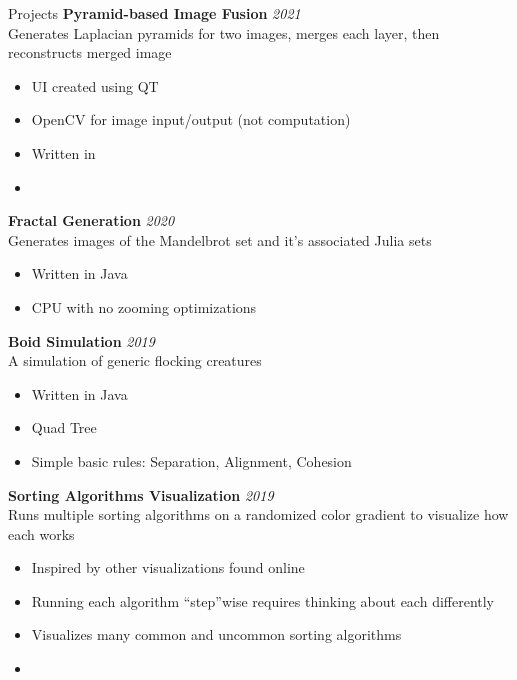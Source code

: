 \begin{rSection}{Projects}
		{\bf Pyramid-based Image Fusion}{} \hfill {\em 2021} \\
		Generates Laplacian pyramids for two images, merges each layer, then reconstructs merged image
		\begin{multicols}{2}
			\begin{itemize}
				\item UI created using QT
				\item OpenCV for image input/output (not computation)
				\item Written in \CC
				\item[\vspace{\fill}] %
			\end{itemize}
		\end{multicols}

		{\bf Fractal Generation}{} \hfill {\em 2020}\\
		Generates images of the Mandelbrot set and it's associated Julia sets
		\begin{multicols}{2}
			\begin{itemize}
				\item Written in Java
				\item CPU with no zooming optimizations
			\end{itemize}
		\end{multicols}

		{\bf Boid Simulation}{} \hfill {\em 2019}\\
		A simulation of generic flocking creatures
		\begin{multicols}{2}
			\begin{itemize}
				\item Written in Java
				\item Quad Tree
				\item Simple basic rules: Separation, Alignment, Cohesion
			\end{itemize}
		\end{multicols}

		{\bf Sorting Algorithms Visualization}{} \hfill {\em 2019}\\
		Runs multiple sorting algorithms on a randomized color gradient to visualize how each works
		\begin{multicols}{2}
			\begin{itemize}
				\item Inspired by other visualizations found online
				\item Running each algorithm ``step''wise requires thinking about each differently
				\item Visualizes many common and uncommon sorting algorithms
				\item[\vspace{\fill}] %
			\end{itemize}
		\end{multicols}
	\end{rSection}
	
